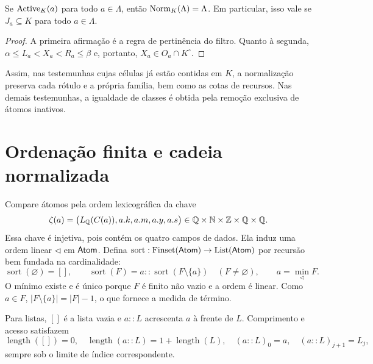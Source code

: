 \begin{proposicao}\label{map:normalizacao:6.5}\label{normalizacao:prop:fixed}
Se $\operatorname{Active}_K(a)$ para todo $a\in\Lambda$, então
$\operatorname{Norm}_K(\Lambda)=\Lambda$. Em particular, isso vale se
$J_a\subseteq K$ para todo $a\in\Lambda$.
\end{proposicao}
\begin{proof}
A primeira afirmação é a regra de pertinência do filtro. Quanto à
segunda, $\alpha\le L_a<X_a<R_a\le\beta$ e, portanto,
$X_a\in O_a\cap K^\circ$.
\end{proof}

Assim, nas testemunhas cujas células já estão contidas em $K$, a
normalização preserva cada rótulo e a própria família, bem como as
cotas de recursos. Nas demais testemunhas, a igualdade de classes
é obtida pela remoção exclusiva de átomos inativos.

\section{Ordenação finita e cadeia normalizada}
\label{normalizacao:sec:chain}

\begin{definicao}\label{map:normalizacao:7.1}\label{normalizacao:def:sort}
Compare átomos pela ordem lexicográfica da chave
\[
 \zeta(a)=\bigl(L_\mathbb Q(C(a)),a.k,a.m,a.y,a.s\bigr)
          \in\mathbb Q\times\mathbb N\times\mathbb Z\times\mathbb Q\times\mathbb Q.
\]
Essa chave é injetiva, pois contém os quatro campos de dados.
Ela induz uma ordem linear $\triangleleft$ em $\mathsf{Atom}$.
Defina $\operatorname{sort}:\operatorname{Finset}(\mathsf{Atom})\to\operatorname{List}(\mathsf{Atom})$ por
recursão bem fundada na cardinalidade:
\[
 \operatorname{sort}(\varnothing)=[],\qquad
 \operatorname{sort}(F)=a::\operatorname{sort}(F\setminus\{a\})
       \quad(F\ne\varnothing),
 \qquad a=\min_{\triangleleft}F.
\]
O mínimo existe e é único porque $F$ é finito não vazio e a ordem
é linear. Como $a\in F$,
$|F\setminus\{a\}|=|F|-1$, o que fornece a medida de término.

Para listas, $[]$ é a lista vazia e $a::L$ acrescenta $a$ à frente
de $L$. Comprimento e acesso satisfazem
\[
 \operatorname{length}([])=0,\quad
 \operatorname{length}(a::L)=1+\operatorname{length}(L),\quad
 (a::L)_0=a,\quad (a::L)_{j+1}=L_j,
\]
sempre sob o limite de índice correspondente.
\end{definicao}

